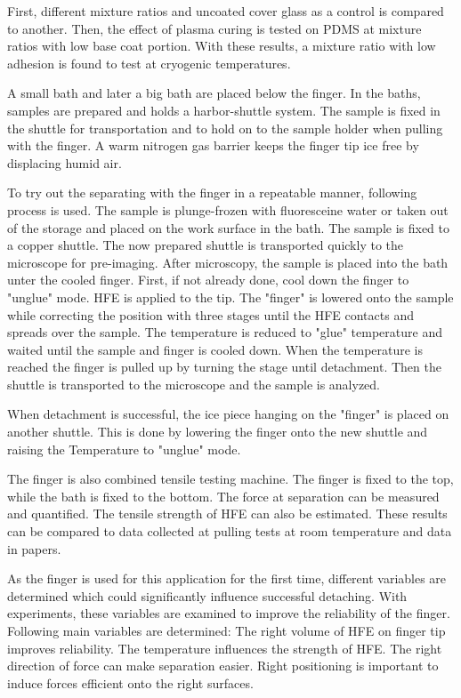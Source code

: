 First, different mixture ratios and uncoated cover glass as a control is compared to another. Then, the effect of plasma curing is tested on PDMS at mixture ratios with low base coat portion. With these results, a mixture ratio with low adhesion is found to test at cryogenic temperatures. 

A small bath and later a big bath are placed below the finger. In the baths, samples are prepared and holds a harbor-shuttle system. The sample is fixed in the shuttle for transportation and to hold on to the sample holder when pulling with the finger. A warm nitrogen gas barrier keeps the finger tip ice free by displacing humid air.

To try out the separating with the finger in a repeatable manner, following process is used. The sample is plunge-frozen with fluoresceine water or taken out of the storage and placed on the work surface in the bath. The sample is fixed to a copper shuttle. The now prepared shuttle is transported quickly to the microscope for pre-imaging. After microscopy, the sample is placed into the bath unter the cooled finger. First, if not already done, cool down the finger to "unglue" mode. HFE is applied to the tip. The "finger" is lowered onto the sample while correcting the position with three stages until the HFE contacts and spreads over the sample. The temperature is reduced to "glue" temperature and waited until the sample and finger is cooled down. When the temperature is reached the finger is pulled up by turning the stage until detachment. Then the shuttle is transported to the microscope and the sample is analyzed.

When detachment is successful, the ice piece hanging on the "finger" is placed on another shuttle. This is done by lowering the finger onto the new shuttle and raising the Temperature to "unglue" mode.

The finger is also combined tensile testing machine. The finger is fixed to the top, while the bath is fixed to the bottom. The force at separation can be measured and quantified. The tensile strength of HFE can also be estimated. These results can be compared to data collected at pulling tests at room temperature and data in papers.

As the finger is used for this application for the first time, different variables are determined which could significantly influence successful detaching. With experiments, these variables are examined to improve the reliability of the finger. Following main variables are determined: The right volume of HFE on finger tip improves reliability. The temperature influences the strength of HFE. The right direction of force can make separation easier. Right positioning is important to induce forces efficient onto the right surfaces.